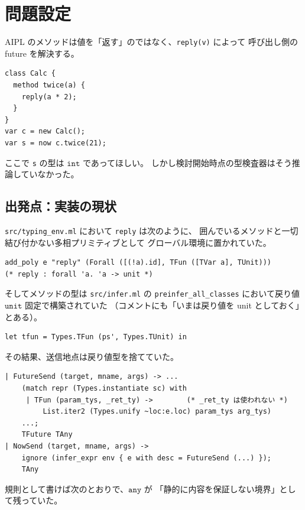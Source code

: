 \documentclass[11pt,a4paper]{ltjsarticle}
\theoremstyle{definition}
\theoremstyle{remark}
\newcommand{\ty}[1]{\ensuremath{\mathtt{#1}}}
\begin{document}
\tableofcontents

\section{問題設定}

AIPL のメソッドは値を「返す」のではなく、\texttt{reply(v)} によって
呼び出し側の future を解決する。

\begin{lstlisting}[language=AIPL]
class Calc {
  method twice(a) {
    reply(a * 2);
  }
}
var c = new Calc();
var s = now c.twice(21);
\end{lstlisting}

ここで \texttt{s} の型は \ty{int} であってほしい。
しかし検討開始時点の型検査器はそう推論していなかった。

\subsection{出発点：実装の現状}

\texttt{src/typing\_env.ml} において \texttt{reply} は次のように、
囲んでいるメソッドと一切結び付かない多相プリミティブとして
グローバル環境に置かれていた。

\begin{lstlisting}
add_poly e "reply" (Forall ([(!a).id], TFun ([TVar a], TUnit)))
(* reply : forall 'a. 'a -> unit *)
\end{lstlisting}

そしてメソッドの型は \texttt{src/infer.ml} の \texttt{preinfer\_all\_classes}
において戻り値 \ty{unit} 固定で構築されていた
（コメントにも「いまは戻り値を unit としておく」とある）。

\begin{lstlisting}
let tfun = Types.TFun (ps', Types.TUnit) in
\end{lstlisting}

その結果、送信地点は戻り値型を捨てていた。

\begin{lstlisting}
| FutureSend (target, mname, args) -> ...
    (match repr (Types.instantiate sc) with
     | TFun (param_tys, _ret_ty) ->        (* _ret_ty は使われない *)
         List.iter2 (Types.unify ~loc:e.loc) param_tys arg_tys)
    ...;
    TFuture TAny
| NowSend (target, mname, args) ->
    ignore (infer_expr env { e with desc = FutureSend (...) });
    TAny
\end{lstlisting}

規則として書けば次のとおりで、\ty{any} が
「静的に内容を保証しない境界」として残っていた。
\end{document}
